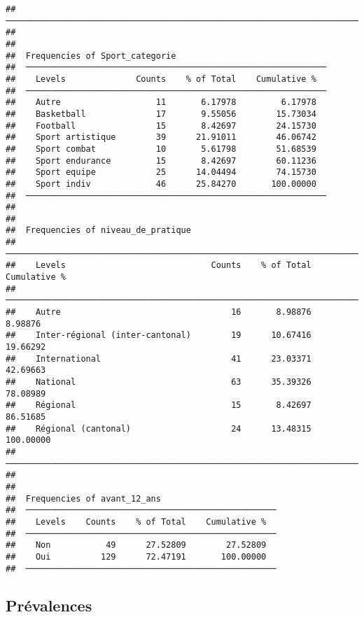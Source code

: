 \documentclass[
]{article}
\begin{document}
\begin{verbatim}
##  ────────────────────────────────────────────────────────────────────────────────── 
## 
## 
##  Frequencies of Sport_categorie                               
##  ──────────────────────────────────────────────────────────── 
##    Levels              Counts    % of Total    Cumulative %   
##  ──────────────────────────────────────────────────────────── 
##    Autre                   11       6.17978         6.17978   
##    Basketball              17       9.55056        15.73034   
##    Football                15       8.42697        24.15730   
##    Sport artistique        39      21.91011        46.06742   
##    Sport combat            10       5.61798        51.68539   
##    Sport endurance         15       8.42697        60.11236   
##    Sport equipe            25      14.04494        74.15730   
##    Sport indiv             46      25.84270       100.00000   
##  ──────────────────────────────────────────────────────────── 
## 
## 
##  Frequencies of niveau_de_pratique                                           
##  ─────────────────────────────────────────────────────────────────────────── 
##    Levels                             Counts    % of Total    Cumulative %   
##  ─────────────────────────────────────────────────────────────────────────── 
##    Autre                                  16       8.98876         8.98876   
##    Inter-régional (inter-cantonal)        19      10.67416        19.66292   
##    International                          41      23.03371        42.69663   
##    National                               63      35.39326        78.08989   
##    Régional                               15       8.42697        86.51685   
##    Régional (cantonal)                    24      13.48315       100.00000   
##  ─────────────────────────────────────────────────────────────────────────── 
## 
## 
##  Frequencies of avant_12_ans                        
##  ────────────────────────────────────────────────── 
##    Levels    Counts    % of Total    Cumulative %   
##  ────────────────────────────────────────────────── 
##    Non           49      27.52809        27.52809   
##    Oui          129      72.47191       100.00000   
##  ──────────────────────────────────────────────────
\end{verbatim}

\hypertarget{pruxe9valences-3}{%
\subsection{Prévalences}\label{pruxe9valences-3}}
\end{document}

